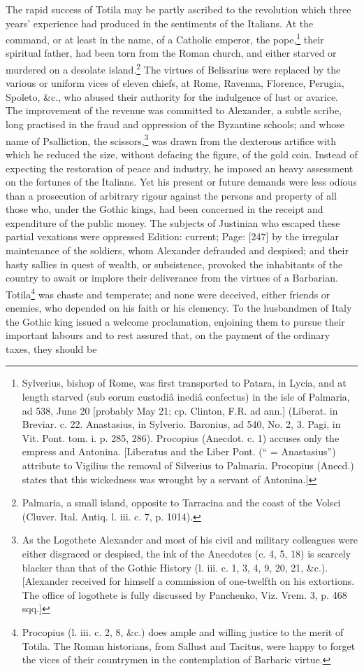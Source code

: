 The rapid success of Totila may be partly ascribed to the revolution which three years\texthebrew{}’ experience had produced in the sentiments of the Italians. At the command, or at least in the name, of a Catholic emperor, the pope,\footnote{Sylverius, bishop of Rome, was first transported to Patara, in Lycia, and at length starved (sub eorum custodiâ inediâ confectus) in the isle of Palmaria, ad 538, June 20 [probably May 21; cp. Clinton, F.R. ad ann.] (Liberat. in Breviar. c. 22. Anastasius, in Sylverio. Baronius, ad 540, No. 2, 3. Pagi, in Vit. Pont. tom. i. p. 285, 286). Procopius (Anecdot. c. 1) accuses only the empress and Antonina. [Liberatus and the Liber Pont. (\texthebrew{“} = Anastasius\texthebrew{}”) attribute to Vigilius the removal of Silverius to Palmaria. Procopius (Anecd.) states that this wickedness was wrought by a servant of Antonina.]} their spiritual father, had been torn from the Roman church, and either starved or murdered on a desolate island.\footnote{Palmaria, a small island, opposite to Tarracina and the coast of the Volsci (Cluver. Ital. Antiq. l. iii. c. 7, p. 1014).} The virtues of Belisarius were replaced by the various or uniform vices of eleven chiefs, at Rome, Ravenna, Florence, Perugia, Spoleto, \&c., who abused their authority for the indulgence of lust or avarice. The improvement of the revenue was committed to Alexander, a subtle scribe, long practised in the fraud and oppression of the Byzantine schools; and whose name of Psalliction, the scissors,\footnote{As the Logothete Alexander and most of his civil and military colleagues were either disgraced or despised, the ink of the Anecdotes (c. 4, 5, 18) is scarcely blacker than that of the Gothic History (l. iii. c. 1, 3, 4, 9, 20, 21, \&c.). [Alexander received for himself a commission of one-twelfth on his extortions. The office of logothete is fully discussed by Panchenko, Viz. Vrem. 3, p. 468 sqq.]} was drawn from the dexterous artifice with which he reduced the size, without defacing the figure, of the gold coin. Instead of expecting the restoration of peace and industry, he imposed an heavy assessment on the fortunes of the Italians. Yet his present or future demands were less odious than a prosecution of arbitrary rigour against the persons and property of all those who, under the Gothic kings, had been concerned in the receipt and expenditure of the public money. The subjects of Justinian who escaped these partial vexations were oppressed Edition: current; Page: [247] by the irregular maintenance of the soldiers, whom Alexander defrauded and despised; and their hasty sallies in quest of wealth, or subsistence, provoked the inhabitants of the country to await or implore their deliverance from the virtues of a Barbarian. Totila\footnote{Procopius (l. iii. c. 2, 8, \&c.) does ample and willing justice to the merit of Totila. The Roman historians, from Sallust and Tacitus, were happy to forget the vices of their countrymen in the contemplation of Barbaric virtue.} was chaste and temperate; and none were deceived, either friends or enemies, who depended on his faith or his clemency. To the husbandmen of Italy the Gothic king issued a welcome proclamation, enjoining them to pursue their important labours and to rest assured that, on the payment of the ordinary taxes, they should be 